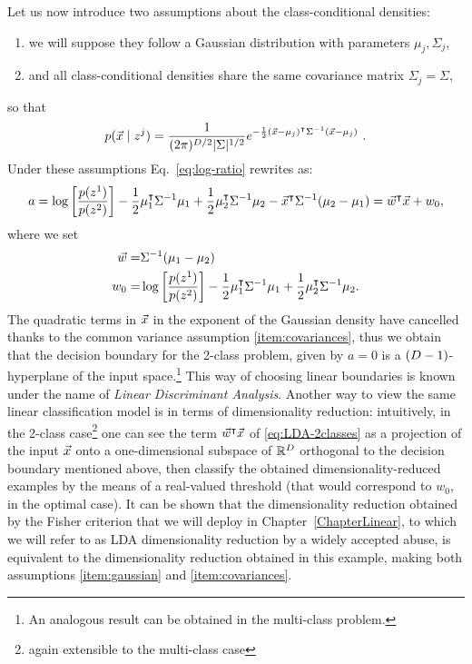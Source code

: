 Let us now introduce two assumptions about the class-conditional densities:
\begin{enumerate}[label=(\roman*)]
\item \label{item:gaussian} we will suppose they follow a Gaussian distribution with parameters $\mu_j, \Sigma_j$,
\item \label{item:covariances} and all class-conditional densities share the same covariance matrix $\Sigma_j=\Sigma$,
\end{enumerate}
so that
\begin{equation}
p(\vec{x}\mid z^j) = \frac{1}{(2\pi)^{{D}/2}\lvert \Sigma\rvert^{1/2}}e^{-\frac{1}{2}(\vec{x}- \mu_j)^\intercal\Sigma^{-1}(\vec{x}- \mu_j)} \mbox{ .}
\end{equation}
Under these assumptions Eq.~\eqref{eq:log-ratio} rewrites as: 
\begin{equation}\label{eq:LDA-2classes}
a = \log\left[\frac{p(z^1)}{p(z^2)}\right] - \frac{1}{2}\mu_1^\intercal\Sigma^{-1}\mu_1 + \frac{1}{2}\mu_2^\intercal\Sigma^{-1}\mu_2 - \vec{x}^\intercal\Sigma^{-1}(\mu_2-\mu_1) = \vec{w}^\intercal \vec{x} + w_0, 
\end{equation}
where we set 
\begin{align*}
\vec{w} =& \Sigma^{-1}(\mu_1-\mu_2)\\
w_0 =  & \log\left[\frac{p(z^1)}{p(z^2)}\right] - \frac{1}{2}\mu_1^\intercal\Sigma^{-1}\mu_1 + \frac{1}{2}\mu_2^\intercal\Sigma^{-1}\mu_2 . 
\end{align*}
The quadratic terms in $\vec{x}$ in the exponent of the Gaussian density have cancelled thanks to the common variance assumption \ref{item:covariances}, thus we obtain that the decision boundary for the 2-class problem, given by $a=0$ is a $(D - 1)$-hyperplane of the input space.\footnote{An analogous result can be obtained in the multi-class problem.} This way of choosing linear boundaries is known under the name of \emph{Linear Discriminant Analysis}. Another way to view the same linear classification model is in terms of dimensionality reduction: intuitively, in the 2-class case\footnote{again extensible to the multi-class case} one can see the term $\vec{w}^\intercal \vec{x}$ of \eqref{eq:LDA-2classes} as a projection of the input $\vec{x}$ onto a one-dimensional subspace of $\mathbb{R}^D$ orthogonal to the decision boundary mentioned above, then classify the obtained dimensionality-reduced examples by the means of a real-valued threshold (that would correspond to $w_0$, in the optimal case). It can be shown that the dimensionality reduction obtained by the Fisher criterion that we will deploy in Chapter~\ref{ChapterLinear}, to which we will refer to as LDA dimensionality reduction by a widely accepted abuse, is equivalent to the dimensionality reduction obtained in this example, making both assumptions \ref{item:gaussian} and \ref{item:covariances}.  \\
